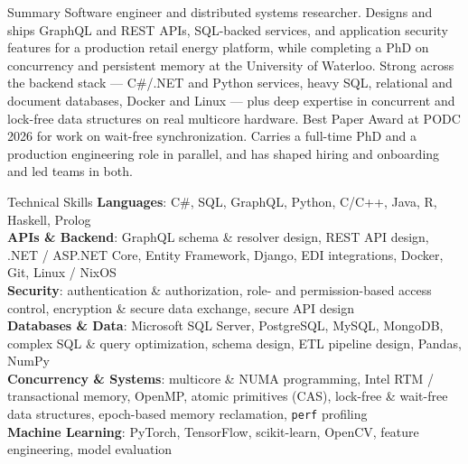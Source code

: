 \documentclass{resume}
\begin{document}
\begin{rSection}{Summary}
Software engineer and distributed systems researcher. Designs and ships GraphQL and REST APIs, SQL-backed services,
and application security features for a production retail energy platform, while completing a PhD on concurrency and
persistent memory at the University of Waterloo. Strong across the backend stack --- C\#/.NET and Python services, heavy
SQL, relational and document databases, Docker and Linux --- plus deep expertise in concurrent and lock-free data
structures on real multicore hardware. Best Paper Award at PODC 2026 for work on wait-free synchronization. Carries a
full-time PhD and a production engineering role in parallel, and has shaped hiring and onboarding and led teams in both.
\end{rSection}

\begin{rSection}{Technical Skills}
\textbf{Languages}: C\#, SQL, GraphQL, Python, C/C++, Java, R, Haskell, Prolog \\
\textbf{APIs \& Backend}: GraphQL schema \& resolver design, REST API design, .NET / ASP.NET Core, Entity Framework, Django, EDI integrations, Docker, Git, Linux / NixOS \\
\textbf{Security}: authentication \& authorization, role- and permission-based access control, encryption \& secure data exchange, secure API design \\
\textbf{Databases \& Data}: Microsoft SQL Server, PostgreSQL, MySQL, MongoDB, complex SQL \& query optimization, schema design, ETL pipeline design, Pandas, NumPy \\
\textbf{Concurrency \& Systems}: multicore \& NUMA programming, Intel RTM / transactional memory, OpenMP, atomic primitives (CAS), lock-free \& wait-free data structures, epoch-based memory reclamation, \texttt{perf} profiling \\
\textbf{Machine Learning}: PyTorch, TensorFlow, scikit-learn, OpenCV, feature engineering, model evaluation
\end{rSection}
\end{document}
